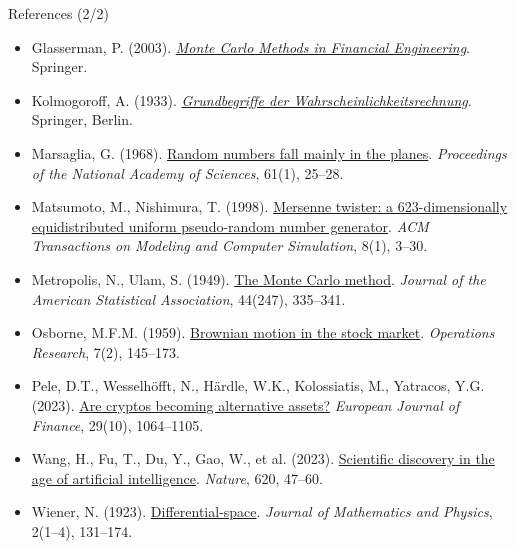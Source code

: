 \begin{frame}{References (2/2)}
\itemsize{\tiny}
\begin{itemize}
    \item Glasserman, P. (2003). \href{https://doi.org/10.1007/978-0-387-21617-1}{\textit{Monte Carlo Methods in Financial Engineering}}. Springer.
    \item Kolmogoroff, A. (1933). \href{https://doi.org/10.1007/978-3-642-49888-6}{\textit{Grundbegriffe der Wahrscheinlichkeitsrechnung}}. Springer, Berlin.
    \item Marsaglia, G. (1968). \href{https://doi.org/10.1073/pnas.61.1.25}{Random numbers fall mainly in the planes}. \textit{Proceedings of the National Academy of Sciences}, 61(1), 25--28.
    \item Matsumoto, M., Nishimura, T. (1998). \href{https://doi.org/10.1145/272991.272995}{Mersenne twister: a 623-dimensionally equidistributed uniform pseudo-random number generator}. \textit{ACM Transactions on Modeling and Computer Simulation}, 8(1), 3--30.
    \item Metropolis, N., Ulam, S. (1949). \href{https://doi.org/10.1080/01621459.1949.10483310}{The Monte Carlo method}. \textit{Journal of the American Statistical Association}, 44(247), 335--341.
    \item Osborne, M.F.M. (1959). \href{https://doi.org/10.1287/opre.7.2.145}{Brownian motion in the stock market}. \textit{Operations Research}, 7(2), 145--173.
    \item Pele, D.T., Wesselhöfft, N., Härdle, W.K., Kolossiatis, M., Yatracos, Y.G. (2023). \href{https://doi.org/10.1080/1351847X.2021.1960403}{Are cryptos becoming alternative assets?} \textit{European Journal of Finance}, 29(10), 1064--1105.
    \item Wang, H., Fu, T., Du, Y., Gao, W., et al. (2023). \href{https://doi.org/10.1038/s41586-023-06221-2}{Scientific discovery in the age of artificial intelligence}. \textit{Nature}, 620, 47--60.
    \item Wiener, N. (1923). \href{https://doi.org/10.1002/sapm192321131}{Differential-space}. \textit{Journal of Mathematics and Physics}, 2(1--4), 131--174.
\end{itemize}
\end{frame}


